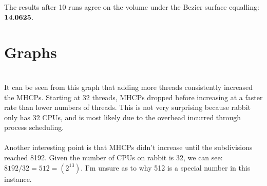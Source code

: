 \documentclass[12pt]{article}
\begin{document}
\noindent The results after 10 runs agree on the volume under the Bezier
surface equalling: ${\bf14.0625}$.

\section*{Graphs}

\pgfplotsset{width=5in}

\\

\noindent It can be seen from this graph that adding more threads consistently
increased the MHCPs. Starting at 32 threads, MHCPs dropped before
increasing at a faster rate than lower numbers of threads. This is not
very surprising because rabbit only has 32 CPUs, and is most likely due
to the overhead incurred through process scheduling.\\
\\
\noindent Another interesting point is that MHCPs didn't increase until the
subdivisions reached 8192. Given the number of CPUs on rabbit is 32, we
can see: $8192/32 = 512 = (2^{13})$. I'm unsure as to why 512 is a
special number in this instance.\\
\end{document}

